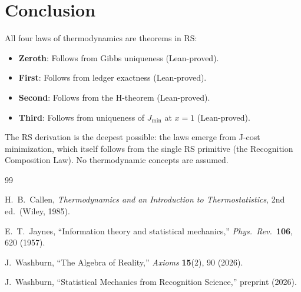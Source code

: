 \documentclass[12pt,a4paper]{article}
\theoremstyle{definition}
\theoremstyle{remark}
\begin{document}
\section{Conclusion}

All four laws of thermodynamics are theorems in RS:
\begin{itemize}
  \item \textbf{Zeroth}: Follows from Gibbs uniqueness (Lean-proved).
  \item \textbf{First}: Follows from ledger exactness (Lean-proved).
  \item \textbf{Second}: Follows from the H-theorem (Lean-proved).
  \item \textbf{Third}: Follows from uniqueness of $J_{\min}$ at $x=1$ (Lean-proved).
\end{itemize}

The RS derivation is the deepest possible: the laws emerge from
J-cost minimization, which itself follows from the single RS primitive
(the Recognition Composition Law).  No thermodynamic concepts are assumed.

\begin{thebibliography}{99}

H.~B.~Callen, \textit{Thermodynamics and an Introduction to Thermostatistics},
2nd ed.\ (Wiley, 1985).

E.~T.~Jaynes, ``Information theory and statistical mechanics,''
\textit{Phys.\ Rev.}\ \textbf{106}, 620 (1957).

J.~Washburn, ``The Algebra of Reality,'' \textit{Axioms} \textbf{15}(2), 90 (2026).

J.~Washburn, ``Statistical Mechanics from Recognition Science,'' preprint (2026).

\end{thebibliography}
\end{document}
